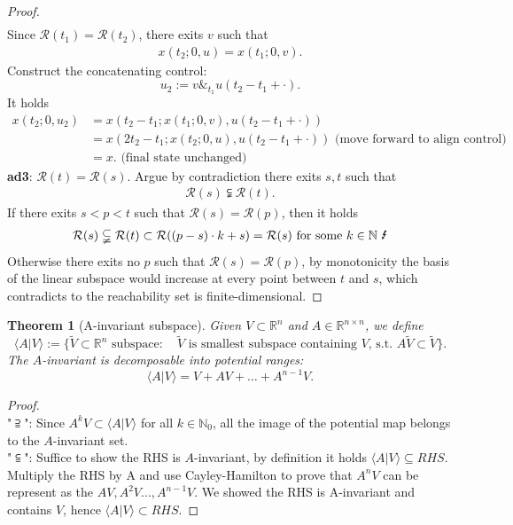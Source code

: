 \documentclass[a4paper,11pt,fleqn]{book}
\newtheorem{theorem}{Theorem}[section]
\theoremstyle{definition}
\theoremstyle{remark}
\begin{document}
\begin{proof}
\begin{align*}
\end{align*}
Since $\mathcal{R}(t_1) = \mathcal{R}(t_2)$, there exits $v$ such that 
\begin{align*}
	x(t_2; 0, u) = x(t_1;0, v). 
\end{align*}
Construct the concatenating control:
\begin{equation}
	u_2:= v \&_{t_1} u(t_2 - t_1 + \cdot).
\end{equation}
It holds
\begin{align*}
	x(t_2;0, u_2) &= x(t_2 - t_1; x(t_1;0, v), u(t_2 - t_1 + \cdot))\\
	&= x(2t_2 - t_1; x(t_2; 0, u), u(t_2 - t_1 + \cdot)) \text{ (move forward to align control)}\\
	&= x. \text{ (final state unchanged)}
\end{align*} 
\textbf{ad3}: $\mathcal{R}(t) = \mathcal{R}(s)$. Argue by contradiction there exits $s, t$ such that 
\begin{align*}
	\mathcal{R}(s) \subsetneqq \mathcal{R}(t).
\end{align*}
If there exits $s <  p< t $ such that $\mathcal{R}(s) = \mathcal{R}(p)$, then it holds
\begin{align*}
	\mathcal{R}(s) \subsetneqq \mathcal{R}(t) \subset \mathcal{R}((p - s)\cdot k + s) = \mathcal{R}(s) \text{ for some $k \in \mathbb{N}$ \Lightning}
\end{align*}
Otherwise there exits no $p$ such that $\mathcal{R}(s) = \mathcal{R}(p)$, by monotonicity the basis of the linear subspace would increase at every point between $t$ and $s$, which contradicts to the reachability set is finite-dimensional. 
 
\end{proof}

\begin{theorem}[A-invariant subspace]
	Given $V \subset \mathbb{R}^n$ and $A \in \mathbb{R}^{n \times n}$, we define 
	\begin{equation}
		\langle A| V \rangle:= \{ \tilde{V} \subset \mathbb{R}^n \text{ subspace}:  \quad \tilde{V} \text{ is smallest subspace containing $V$, s.t. $A \tilde{V} \subset \tilde{V}$} \}.
	\end{equation}
	The $A$-invariant is decomposable into potential ranges:
	\begin{equation}
		\langle A| V\rangle =  V + AV + \dots + A^{n -1} V . 
	\end{equation}
\end{theorem}
\begin{proof}
 \quad\\ 
  "$\supseteqq$": Since $A^k V \subset \langle A| V \rangle $ for all $k \in \mathbb{N}_0$, all the image of the potential map belongs to the $A$-invariant set. 
  \quad\\ 
"$\subseteqq$": Suffice to show the RHS is $A$-invariant, by definition it holds $\langle A|V \rangle \subseteq RHS$. \\ Multiply the RHS by A and use Cayley-Hamilton to prove that $A^n V$ can be represent as the $AV, A^2 V \dots, A^{n -1}V$.
We showed the RHS is A-invariant and contains $V$, hence $\langle A | V \rangle \subset RHS$. 
\end{proof}
\end{document}
